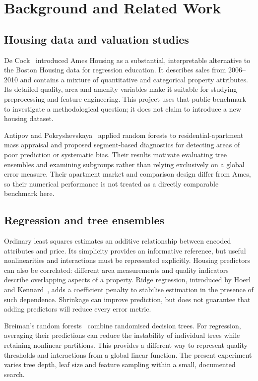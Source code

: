 \documentclass{sigkddExp}
\begin{document}
\section{Background and Related Work}
\subsection{Housing data and valuation studies}
De Cock~\cite{decock} introduced Ames Housing as a substantial, interpretable alternative to the Boston Housing data for regression education. It describes sales from 2006--2010 and contains a mixture of quantitative and categorical property attributes. Its detailed quality, area and amenity variables make it suitable for studying preprocessing and feature engineering. This project uses that public benchmark to investigate a methodological question; it does not claim to introduce a new housing dataset.

Antipov and Pokryshevskaya~\cite{antipov} applied random forests to residential-apartment mass appraisal and proposed segment-based diagnostics for detecting areas of poor prediction or systematic bias. Their results motivate evaluating tree ensembles and examining subgroups rather than relying exclusively on a global error measure. Their apartment market and comparison design differ from Ames, so their numerical performance is not treated as a directly comparable benchmark here.

\subsection{Regression and tree ensembles}
Ordinary least squares estimates an additive relationship between encoded attributes and price. Its simplicity provides an informative reference, but useful nonlinearities and interactions must be represented explicitly. Housing predictors can also be correlated: different area measurements and quality indicators describe overlapping aspects of a property. Ridge regression, introduced by Hoerl and Kennard~\cite{ridge}, adds a coefficient penalty to stabilise estimation in the presence of such dependence. Shrinkage can improve prediction, but does not guarantee that adding predictors will reduce every error metric.

Breiman's random forests~\cite{breiman} combine randomised decision trees. For regression, averaging their predictions can reduce the instability of individual trees while retaining nonlinear partitions. This provides a different way to represent quality thresholds and interactions from a global linear function. The present experiment varies tree depth, leaf size and feature sampling within a small, documented search.
\end{document}
